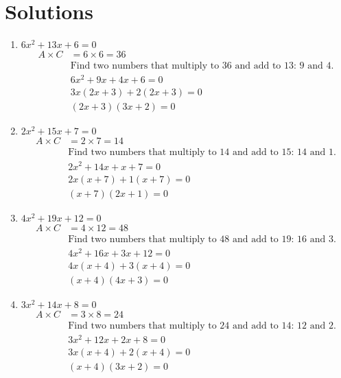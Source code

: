 \documentclass[12pt]{article}
\begin{document}
\newpage

\section*{Solutions}

\begin{enumerate}
    \item $6x^2 + 13x + 6 = 0$
    \begin{align*}
        A \times C & = 6 \times 6 = 36 \\
        & \text{Find two numbers that multiply to 36 and add to 13: } 9 \text{ and } 4. \\
        & 6x^2 + 9x + 4x + 6 = 0 \\
        & 3x(2x + 3) + 2(2x + 3) = 0 \\
        & (2x + 3)(3x + 2) = 0
    \end{align*}
    
    \item $2x^2 + 15x + 7 = 0$
    \begin{align*}
        A \times C & = 2 \times 7 = 14 \\
        & \text{Find two numbers that multiply to 14 and add to 15: } 14 \text{ and } 1. \\
        & 2x^2 + 14x + x + 7 = 0 \\
        & 2x(x + 7) + 1(x + 7) = 0 \\
        & (x + 7)(2x + 1) = 0
    \end{align*}

    \item $4x^2 + 19x + 12 = 0$
    \begin{align*}
        A \times C & = 4 \times 12 = 48 \\
        & \text{Find two numbers that multiply to 48 and add to 19: } 16 \text{ and } 3. \\
        & 4x^2 + 16x + 3x + 12 = 0 \\
        & 4x(x + 4) + 3(x + 4) = 0 \\
        & (x + 4)(4x + 3) = 0
    \end{align*}

    \item $3x^2 + 14x + 8 = 0$
    \begin{align*}
        A \times C & = 3 \times 8 = 24 \\
        & \text{Find two numbers that multiply to 24 and add to 14: } 12 \text{ and } 2. \\
        & 3x^2 + 12x + 2x + 8 = 0 \\
        & 3x(x + 4) + 2(x + 4) = 0 \\
        & (x + 4)(3x + 2) = 0
    \end{align*}


\end{enumerate}
\end{document}
